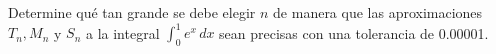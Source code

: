 \item Determine qué tan grande se debe elegir $n$ de manera que las aproximaciones $T_n, M_n$ y $S_n$ a la integral $\int_{0}^{1} e^x \, dx$ sean precisas con una tolerancia de 0.00001.
